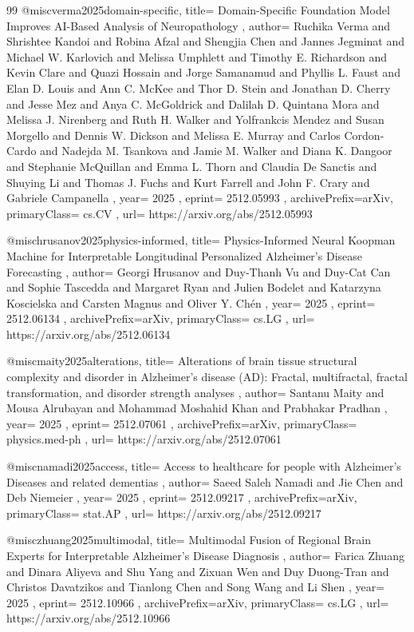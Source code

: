 \documentclass[11pt,a4paper]{article}
\begin{document}
\begin{thebibliography}{99}
@misc{verma2025domain-specific,
  title={ Domain-Specific Foundation Model Improves AI-Based Analysis of Neuropathology },
  author={ Ruchika Verma and Shrishtee Kandoi and Robina Afzal and Shengjia Chen and Jannes Jegminat and Michael W. Karlovich and Melissa Umphlett and Timothy E. Richardson and Kevin Clare and Quazi Hossain and Jorge Samanamud and Phyllis L. Faust and Elan D. Louis and Ann C. McKee and Thor D. Stein and Jonathan D. Cherry and Jesse Mez and Anya C. McGoldrick and Dalilah D. Quintana Mora and Melissa J. Nirenberg and Ruth H. Walker and Yolfrankcis Mendez and Susan Morgello and Dennis W. Dickson and Melissa E. Murray and Carlos Cordon-Cardo and Nadejda M. Tsankova and Jamie M. Walker and Diana K. Dangoor and Stephanie McQuillan and Emma L. Thorn and Claudia De Sanctis and Shuying Li and Thomas J. Fuchs and Kurt Farrell and John F. Crary and Gabriele Campanella },
  year={ 2025 },
  eprint={ 2512.05993 },
  archivePrefix={arXiv},
  primaryClass={ cs.CV },
  url={ https://arxiv.org/abs/2512.05993 }
}


@misc{hrusanov2025physics-informed,
  title={ Physics-Informed Neural Koopman Machine for Interpretable Longitudinal Personalized Alzheimer's Disease Forecasting },
  author={ Georgi Hrusanov and Duy-Thanh Vu and Duy-Cat Can and Sophie Tascedda and Margaret Ryan and Julien Bodelet and Katarzyna Koscielska and Carsten Magnus and Oliver Y. Chén },
  year={ 2025 },
  eprint={ 2512.06134 },
  archivePrefix={arXiv},
  primaryClass={ cs.LG },
  url={ https://arxiv.org/abs/2512.06134 }
}


@misc{maity2025alterations,
  title={ Alterations of brain tissue structural complexity and disorder in Alzheimer's disease (AD): Fractal, multifractal, fractal transformation, and disorder strength analyses },
  author={ Santanu Maity and Mousa Alrubayan and Mohammad Moshahid Khan and Prabhakar Pradhan },
  year={ 2025 },
  eprint={ 2512.07061 },
  archivePrefix={arXiv},
  primaryClass={ physics.med-ph },
  url={ https://arxiv.org/abs/2512.07061 }
}


@misc{namadi2025access,
  title={ Access to healthcare for people with Alzheimer's Diseases and related dementias },
  author={ Saeed Saleh Namadi and Jie Chen and Deb Niemeier },
  year={ 2025 },
  eprint={ 2512.09217 },
  archivePrefix={arXiv},
  primaryClass={ stat.AP },
  url={ https://arxiv.org/abs/2512.09217 }
}


@misc{zhuang2025multimodal,
  title={ Multimodal Fusion of Regional Brain Experts for Interpretable Alzheimer's Disease Diagnosis },
  author={ Farica Zhuang and Dinara Aliyeva and Shu Yang and Zixuan Wen and Duy Duong-Tran and Christos Davatzikos and Tianlong Chen and Song Wang and Li Shen },
  year={ 2025 },
  eprint={ 2512.10966 },
  archivePrefix={arXiv},
  primaryClass={ cs.LG },
  url={ https://arxiv.org/abs/2512.10966 }
}



\end{thebibliography}
\end{document}
